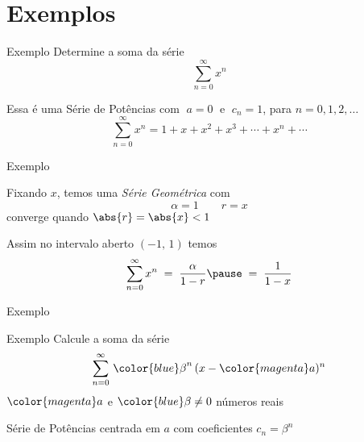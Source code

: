 \documentclass[fleqn,utf8,aspectratio=169,12pt]{beamer}
\begin{document}
\section{Exemplos}

\addtocounter{exemplo}{1}
\begin{frame}{Exemplo \theexemplo}
  Determine a soma da série
  \[
    \sum_{n=0}^\infty x^n
  \]

  \pause
  Essa é uma Série de Potências com $\;a=0\;$ e $\;c_n=1$, para $n=0, 1, 2,\dots$
  \[
    \sum_{n=0}^\infty x^n = 1 + x + x^2 + x^3 + \cdots + x^n + \cdots
  \]
\end{frame}

\begin{frame}{Exemplo \theexemplo}

  Fixando $x$, temos uma \emph{Série Geométrica}
  \pause
  com
  \[
    \alpha = 1
    \qquad
    r = x
  \]
  \pause
  converge quando \(\abs{r} = \abs{x} < 1\)

  \pause
  \vspace{\baselineskip}
  Assim no intervalo aberto $(-1,\,1)$ temos
  \[
    \sum_{n=0}^\infty x^n
    \;=\; \frac{\alpha}{1-r}
    \pause
    \;=\; \frac{1}{1-x}
  \]
\end{frame}

\begin{frame}{Exemplo \theexemplo}
  \vspace{1.5\baselineskip}
  \scalebox{0.86}{}
\end{frame}

\addtocounter{exemplo}{1}
\begin{frame}{Exemplo \theexemplo}
  Calcule a soma da série
  \[
    \sum_{n=0}^\infty \,{\color{blue}\beta}^n\,(x-{\color{magenta}a})^n
  \]
  \(\color{magenta}a\) e \({\color{blue}\beta}\neq 0\) números reais

  \pause
  \vspace{\baselineskip}
  Série de Potências centrada em \(a\) com coeficientes \(c_n=\beta^n\)
\end{frame}
\end{document}
